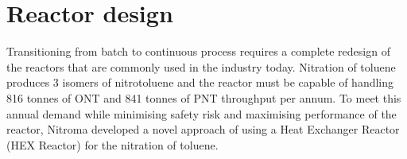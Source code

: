 \section*{Reactor design}
Transitioning from batch to continuous process requires a complete redesign of the reactors that are commonly used in the industry today. Nitration of toluene produces 3 isomers of nitrotoluene and the reactor must be capable of handling 816 tonnes of ONT and 841 tonnes of PNT throughput per annum. To meet this annual demand while minimising safety risk and maximising performance of the reactor, Nitroma developed a novel approach of using a Heat Exchanger Reactor (HEX Reactor) for the nitration of toluene.


